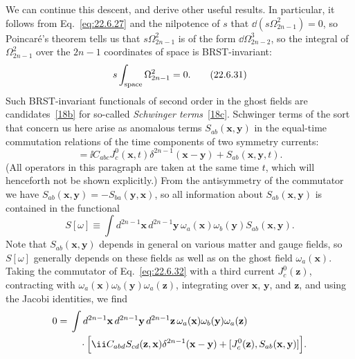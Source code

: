 We can continue this descent, and derive other useful results. In
particular, it follows from Eq.~\eqref{eq:22.6.27} and the nilpotence of
$s$ that $\dd(s\Omega^2_{2n-1})=0$, so Poincaré's theorem tells us that
$s\Omega^2_{2n-1}$ is of the form $\dd\Omega^3_{2n-2}$, so the integral of
$\Omega^2_{2n-1}$ over the $2n-1$ coordinates of space is BRST-invariant:
\begin{equation}
 s\int_{\rm space}\Omega^2_{2n-1}=0.
 \tag{22.6.31}\label{eq:22.6.31}
\end{equation}
Such BRST-invariant functionals of second order in the ghost fields are
candidates~\hyperref[ch22-ref-18b]{[18b]} for so-called
\emph{Schwinger terms}~\hyperref[ch22-ref-18c]{[18c]}. Schwinger terms of
the sort that concern us here arise as anomalous terms
$S_{ab}(\mathbf x,\mathbf y)$ in the equal-time commutation
relations of the time components of two symmetry currents:
\begin{equation}
 [J^0_a(\mathbf x,t),J^0_b(\mathbf y,t)]
 =\ii C_{abc}J^0_c(\mathbf x,t)
 \delta^{2n-1}(\mathbf x-\mathbf y)
 +S_{ab}(\mathbf x,\mathbf y,t).
 \tag{22.6.32}\label{eq:22.6.32}
\end{equation}
(All operators in this paragraph are taken at the same time $t$, which
will henceforth not be shown explicitly.) From the antisymmetry of the
commutator we have
$S_{ab}(\mathbf x,\mathbf y)
=-S_{ba}(\mathbf y,\mathbf x)$, so all information about
$S_{ab}(\mathbf x,\mathbf y)$ is contained in the functional
\begin{equation}
 S[\omega]\equiv\int d^{2n-1}\mathbf x\,d^{2n-1}\mathbf y\,
 \omega_a(\mathbf x)\omega_b(\mathbf y)
 S_{ab}(\mathbf x,\mathbf y).
 \tag{22.6.33}\label{eq:22.6.33}
\end{equation}
Note that $S_{ab}(\mathbf x,\mathbf y)$ depends in general on
various matter and gauge fields, so $S[\omega]$ generally depends on these
fields as well as on the ghost field $\omega_a(\mathbf x)$. Taking the
commutator of Eq.~\eqref{eq:22.6.32} with a third current
$J^0_c(\mathbf z)$, contracting with
$\omega_a(\mathbf x)\omega_b(\mathbf y)\omega_a(\mathbf z)$,
integrating over $\mathbf x$, $\mathbf y$, and $\mathbf z$, and using the
Jacobi identities, we find
\[
 \begin{aligned}
 0={}&\int d^{2n-1}\mathbf x\,d^{2n-1}\mathbf y\,
 d^{2n-1}\mathbf z\,
 \omega_a(\mathbf x)\omega_b(\mathbf y)
 \omega_a(\mathbf z)
 \\
 &\quad{}\cdot\Bigl[
 \ii C_{abd}
 S_{cd}(\mathbf z,\mathbf x)
 \delta^{2n-1}(\mathbf x-\mathbf y)
 +[J^0_c(\mathbf z),
 S_{ab}(\mathbf x,\mathbf y)]
 \Bigr].
 \end{aligned}
\]
